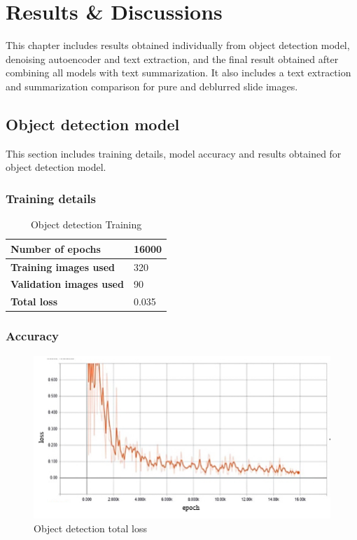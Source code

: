 \chapter{Results \& Discussions}
\indent\indent This chapter includes results obtained individually from object detection model, denoising autoencoder and text extraction, and the final result obtained after combining all models with text summarization. It also includes a text extraction and summarization comparison for pure and deblurred slide images.
\section{Object detection model}
This section includes training details, model accuracy and results obtained for object detection model.
\subsection{Training details}
\begin{table}[H]
\centering
\fontsize{10}{12}\selectfont
\caption{Object detection Training}
\label{c6:tab1}
\small\addtolength{\tabcolsep}{40pt}
\def\arraystretch{1.5}
\begin{tabular}{|p{5cm}|p{2cm}|}
	\hline
	
	\textbf{Number of epochs}   & 16000\\\hline
	\textbf{Training images used}&   320\\\hline
	\textbf{Validation images used} & 90\\\hline
	\textbf{Total loss}  &  0.035\\\hline
\end{tabular}
\end{table}
\subsection{Accuracy}
\begin{figure}[H]
\centering
	\includegraphics[scale=1]{Figures/ob_loss.png}	
	\caption{Object detection total loss}
	\label{fig:ob_loss}
\end{figure}

